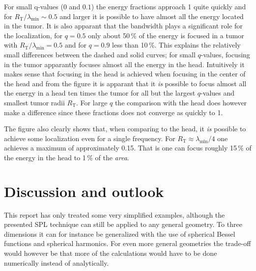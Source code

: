 \documentclass[11pt,a4paper, 
swedish,english %
]{article}
\newcommand{\RT}{\ensuremath{R_{\text{T}}}}
\begin{document}
For small q-values ($0$ and $0.1$) the energy fractions approach 1 quite quickly and for $\RT/\lambda_{\min} \sim 0.5$ 
and larger it is possible to have almost all the energy located in the tumor. It is also apparant that the bandwidth plays a significant role for the localization, for $q=0.5$ only about 50\,\% of the energy is focused in a tumor with $\RT/\lambda_{\min}=0.5$ and for $q=0.9$ less than 10\,\%.
This explains the relatively small differences between the dashed and solid curves; for small $q$-values, focusing in the tumor apparantly focuses almost all the energy in the head. Intuitively it makes sense that focusing in the head is achieved when focusing in the center of the head and from the figure it is apparant that it \emph{is} possible to focus almost all the energy in a head ten times the tumor for all but the largest $q$-values and smallest tumor radii $\RT$. For large $q$ the comparison with the head does however make a difference since these fractions does not converge as quickly to 1. 

The figure also clearly shows that, when comparing to the head, it \emph{is} possible to achieve some localization even for a single frequency. For $\RT \approx \lambda_{\min}/4$ one achieves a maximum of approximately 0.15. That is one can focus roughly 15\,\% of the energy in the head to 1\,\% of the \emph{area}.



\section{Discussion and outlook}

This report has only treated some very simplified examples, although
the presented SPL technique can still be applied to any general
geometry. To three dimensions it can for instance be generalized with
the use of spherical Bessel functions and spherical harmonics. For
even more general geometries the trade-off would however be that more
of the calculations would have to be done numerically instead of
analytically.  
\end{document}
